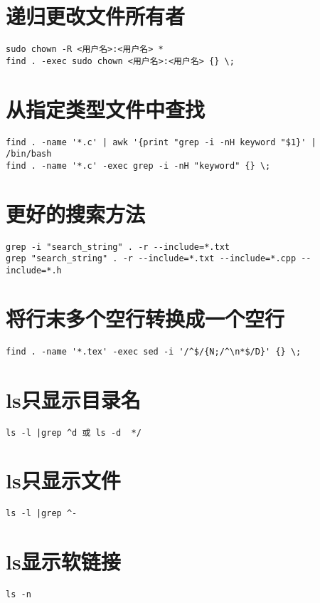 \documentclass[a4paper,fontset=fandol,zihao=-4,linespread=1.2]{ctexbook}
\begin{document}
\section{递归更改文件所有者}
\begin{lstlisting}
sudo chown -R <用户名>:<用户名> *
find . -exec sudo chown <用户名>:<用户名> {} \;
\end{lstlisting}

\section{从指定类型文件中查找}
\begin{lstlisting}
find . -name '*.c' | awk '{print "grep -i -nH keyword "$1}' | /bin/bash
find . -name '*.c' -exec grep -i -nH "keyword" {} \;
\end{lstlisting}

\section{更好的搜索方法}
\begin{lstlisting}
grep -i "search_string" . -r --include=*.txt
grep "search_string" . -r --include=*.txt --include=*.cpp --include=*.h
\end{lstlisting}

\section{将行末多个空行转换成一个空行}
\begin{lstlisting}
find . -name '*.tex' -exec sed -i '/^$/{N;/^\n*$/D}' {} \;
\end{lstlisting}

\section{ls只显示目录名}
\begin{lstlisting}
ls -l |grep ^d 或 ls -d  */
\end{lstlisting}

\section{ls只显示文件}
\begin{lstlisting}
ls -l |grep ^-
\end{lstlisting}

\section{ls显示软链接}
\begin{lstlisting}
ls -n
\end{lstlisting}
\end{document}

